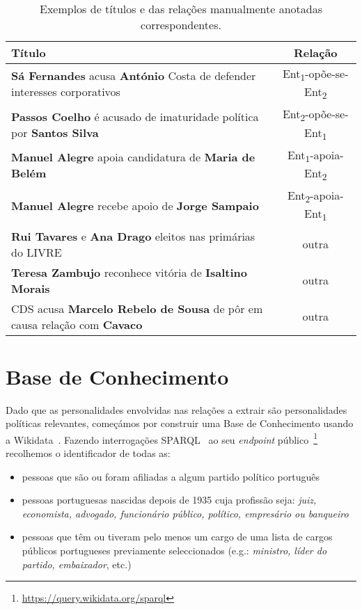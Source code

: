 \documentclass[a4paper, twocolumn, 11pt, twoside]{article}
\begin{document}
\begin{table*}[!h]
  \centering
  \begin{tabular}{lc}
      {\bf Título} & {\bf Relação} \\
      \hline
	  \textbf{Sá Fernandes} acusa \textbf{António} Costa de defender interesses corporativos &	Ent\textsubscript{1}-opõe-se-Ent\textsubscript{2} \\
	  \textbf{Passos Coelho} é acusado de imaturidade política por \textbf{Santos Silva} &	Ent\textsubscript{2}-opõe-se-Ent\textsubscript{1}	\\
	  \textbf{Manuel Alegre} apoia candidatura de \textbf{Maria de Belém} &	Ent\textsubscript{1}-apoia-Ent\textsubscript{2}	\\
	  \textbf{Manuel Alegre} recebe apoio de \textbf{Jorge Sampaio} & Ent\textsubscript{2}-apoia-Ent\textsubscript{1}	\\
	  \textbf{Rui Tavares} e \textbf{Ana Drago} eleitos nas primárias do LIVRE & outra	\\
	  \textbf{Teresa Zambujo} reconhece vitória de \textbf{Isaltino Morais} & outra	\\
	  CDS acusa \textbf{Marcelo Rebelo de Sousa} de pôr em causa relação com \textbf{Cavaco} & outra \\
	  \hline
  \end{tabular}
  \caption{Exemplos de títulos e das relações manualmente anotadas correspondentes.}
  \label{tab:samples}
\end{table*}

\section{Base de Conhecimento}
\label{sec_kb}
Dado que as personalidades envolvidas nas relações a extrair são personalidades políticas relevantes, começámos por construir uma Base de Conhecimento usando a Wikidata~\citep{MKGGB2018}. Fazendo interrogações SPARQL~\cite{2013sparql} ao seu \textit{endpoint} público~\footnote{\url{https://query.wikidata.org/sparql}} recolhemos o identificador de todas as:

\begin{itemize}  
\item pessoas que são ou foram afiliadas a algum partido político português
\item pessoas portuguesas nascidas depois de 1935 cuja profissão seja: \textit{juiz, economista, advogado, funcionário público, político, empresário ou banqueiro}
\item pessoas que têm ou tiveram pelo menos um cargo de uma lista de cargos públicos portugueses previamente seleccionados (e.g.: \textit{ministro, líder do partido, embaixador}, etc.)
\end{itemize}  
\end{document}
